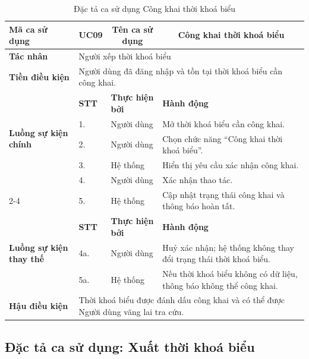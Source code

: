 \documentclass[../DoAn.tex]{subfiles}
\begin{document}
\begin{longtable}{|p{2.8cm}|p{1cm}|p{2.8cm}|p{6.3cm}|}
\caption{Đặc tả ca sử dụng Công khai thời khoá biểu}
\label{tab:app_uc_cong_khai_tkb} \\
\hline
\multicolumn{1}{|l|}{\textbf{Mã ca sử dụng}} & \multicolumn{1}{c|}{UC09} &
\multicolumn{1}{c|}{\textbf{Tên ca sử dụng}} & \multicolumn{1}{c|}{Công khai thời khoá biểu} \\
\hline
\multicolumn{1}{|l|}{\textbf{Tác nhân}} & \multicolumn{3}{l|}{Người xếp thời khoá biểu} \\
\hline
\multicolumn{1}{|l|}{\textbf{Tiền điều kiện}} & \multicolumn{3}{p{10.5cm}|}{Người dùng đã đăng nhập và tồn tại thời khoá biểu cần công khai.} \\
\hline
\multirow{5}{2.8cm}{\textbf{Luồng sự kiện chính}} & \textbf{STT} & \textbf{Thực hiện bởi} & \textbf{Hành động} \\
\cline{2-4}
& 1. & Người dùng & Mở thời khoá biểu cần công khai. \\
\cline{2-4}
& 2. & Người dùng & Chọn chức năng ``Công khai thời khoá biểu''. \\
\cline{2-4}
& 3. & Hệ thống & Hiển thị yêu cầu xác nhận công khai. \\
\cline{2-4}
& 4. & Người dùng & Xác nhận thao tác. \\
\cline{2-4}
& 5. & Hệ thống & Cập nhật trạng thái công khai và thông báo hoàn tất. \\
\hline
\multirow{3}{2.8cm}{\textbf{Luồng sự kiện thay thế}} & \textbf{STT} & \textbf{Thực hiện bởi} & \textbf{Hành động} \\
\cline{2-4}
& 4a. & Người dùng & Huỷ xác nhận; hệ thống không thay đổi trạng thái thời khoá biểu. \\
\cline{2-4}
& 5a. & Hệ thống & Nếu thời khoá biểu không có dữ liệu, thông báo không thể công khai. \\
\hline
\multicolumn{1}{|l|}{\textbf{Hậu điều kiện}} & \multicolumn{3}{p{10.5cm}|}{Thời khoá biểu được đánh dấu công khai và có thể được Người dùng vãng lai tra cứu.} \\
\hline
\end{longtable}

\subsection{Đặc tả ca sử dụng: Xuất thời khoá biểu}
\end{document}

